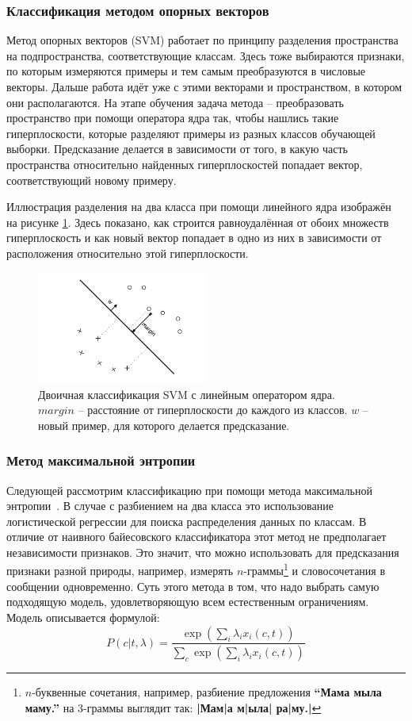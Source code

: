 \subsubsection{Классификация методом опорных векторов}
Метод опорных векторов (SVM)\cite{tong2002support} работает по принципу разделения пространства на
подпространства, соответствующие классам. Здесь тоже выбираются признаки, по которым измеряются
примеры и тем самым преобразуются в числовые векторы. Дальше работа идёт уже с этими векторами и
пространством, в котором они располагаются. На этапе обучения задача метода -- преобразовать
пространство при помощи оператора ядра так, чтобы нашлись такие гиперплоскости,
которые разделяют примеры из разных классов обучающей выборки. Предсказание делается в зависимости
от того, в какую часть пространства относительно найденных гиперплоскостей попадает вектор,
соответствующий новому примеру.

Иллюстрация разделения на два класса при помощи линейного ядра изображён на рисунке
\ref{linear_svm}. Здесь показано, как строится равноудалённая от обоих множеств гиперплоскость и как
новый вектор попадает в одно из них в зависимости от расположения относительно этой гиперплоскости.

\begin{figure}
  \centering
  \includegraphics[width=0.5\textwidth]{linear_svm}
  \caption{Двоичная классификация SVM с линейным оператором ядра. $margin$ -- расстояние от
    гиперплоскости до каждого из классов. $w$ -- новый пример, для которого делается предсказание.}\label{linear_svm}
\end{figure}

\subsubsection{Метод максимальной энтропии}
Следующей рассмотрим классификацию при помощи метода максимальной энтропии~\cite{nigam1999using}. В
случае с разбиением на два класса это использование логистической регрессии для поиска распределения
данных по классам. В отличие от наивного байесовского классификатора этот метод не
предполагает независимости признаков. Это значит, что можно использовать для предсказания признаки
разной природы, например, измерять $n$-граммы\footnote{$n$-буквенные сочетания, например, разбиение
  предложения \textbf{``Мама мыла маму.''} на 3-граммы выглядит так: \textbf{|Мам|а м|ыла| ра|му.|}} и словосочетания в сообщении одновременно.
Суть этого метода в том, что надо выбрать самую
подходящую модель, удовлетворяющую всем естественным ограничениям. Модель описывается формулой:
$$P(c|t,\lambda) = \frac{\exp\left (\sum_i\lambda_ix_i(c,t)\right )}
{\sum_{c}\exp\left (\sum_i\lambda_ix_i(c,t)\right )}$$


